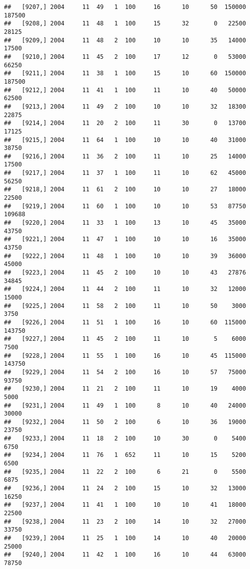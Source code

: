 \documentclass{article}\usepackage[]{graphicx}\usepackage[]{color}
\makeatletter
\newenvironment{kframe}{%
 \def\at@end@of@kframe{}%
 \ifinner\ifhmode%
  \def\at@end@of@kframe{\end{minipage}}%
  \begin{minipage}{\columnwidth}%
 \fi\fi%
 \def\FrameCommand##1{\hskip\@totalleftmargin \hskip-\fboxsep
 \colorbox{shadecolor}{##1}\hskip-\fboxsep
     \hskip-\linewidth \hskip-\@totalleftmargin \hskip\columnwidth}%
 \MakeFramed {\advance\hsize-\width
   \@totalleftmargin\z@ \linewidth\hsize
   \@setminipage}}%
 {\par\unskip\endMakeFramed%
 \at@end@of@kframe}
\newenvironment{knitrout}{}{} %
\makeatother
\begin{document}
\begin{knitrout}
\begin{kframe}
\begin{verbatim}
##   [9207,] 2004     11  49   1  100     16      10      50  150000  187500
##   [9208,] 2004     11  48   1  100     15      32       0   22500   28125
##   [9209,] 2004     11  48   2  100     10      10      35   14000   17500
##   [9210,] 2004     11  45   2  100     17      12       0   53000   66250
##   [9211,] 2004     11  38   1  100     15      10      60  150000  187500
##   [9212,] 2004     11  41   1  100     11      10      40   50000   62500
##   [9213,] 2004     11  49   2  100     10      10      32   18300   22875
##   [9214,] 2004     11  20   2  100     11      30       0   13700   17125
##   [9215,] 2004     11  64   1  100     10      10      40   31000   38750
##   [9216,] 2004     11  36   2  100     11      10      25   14000   17500
##   [9217,] 2004     11  37   1  100     11      10      62   45000   56250
##   [9218,] 2004     11  61   2  100     10      10      27   18000   22500
##   [9219,] 2004     11  60   1  100     10      10      53   87750  109688
##   [9220,] 2004     11  33   1  100     13      10      45   35000   43750
##   [9221,] 2004     11  47   1  100     10      10      16   35000   43750
##   [9222,] 2004     11  48   1  100     10      10      39   36000   45000
##   [9223,] 2004     11  45   2  100     10      10      43   27876   34845
##   [9224,] 2004     11  44   2  100     11      10      32   12000   15000
##   [9225,] 2004     11  58   2  100     11      10      50    3000    3750
##   [9226,] 2004     11  51   1  100     16      10      60  115000  143750
##   [9227,] 2004     11  45   2  100     11      10       5    6000    7500
##   [9228,] 2004     11  55   1  100     16      10      45  115000  143750
##   [9229,] 2004     11  54   2  100     16      10      57   75000   93750
##   [9230,] 2004     11  21   2  100     11      10      19    4000    5000
##   [9231,] 2004     11  49   1  100      8      10      40   24000   30000
##   [9232,] 2004     11  50   2  100      6      10      36   19000   23750
##   [9233,] 2004     11  18   2  100     10      30       0    5400    6750
##   [9234,] 2004     11  76   1  652     11      10      15    5200    6500
##   [9235,] 2004     11  22   2  100      6      21       0    5500    6875
##   [9236,] 2004     11  24   2  100     15      10      32   13000   16250
##   [9237,] 2004     11  41   1  100     10      10      41   18000   22500
##   [9238,] 2004     11  23   2  100     14      10      32   27000   33750
##   [9239,] 2004     11  25   1  100     14      10      40   20000   25000
##   [9240,] 2004     11  42   1  100     16      10      44   63000   78750

\end{verbatim}
\end{kframe}
\end{knitrout}
\end{document}
